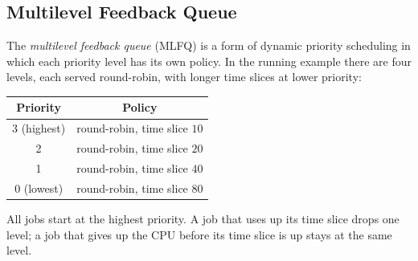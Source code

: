 \subsection{Multilevel Feedback Queue}

The \emph{multilevel feedback queue} (MLFQ) is a form of dynamic priority scheduling in which each priority level has its own policy. In the running example there are four levels, each served round-robin, with longer time slices at lower priority:
\begin{center}
\begin{tabular}{cc}
  \toprule
  Priority & Policy \\
  \midrule
  3 (highest) & round-robin, time slice $10$ \\
  2 & round-robin, time slice $20$ \\
  1 & round-robin, time slice $40$ \\
  0 (lowest) & round-robin, time slice $80$ \\
  \bottomrule
\end{tabular}
\end{center}
All jobs start at the highest priority. A job that uses up its time slice drops one level; a job that gives up the CPU before its time slice is up stays at the same level.

